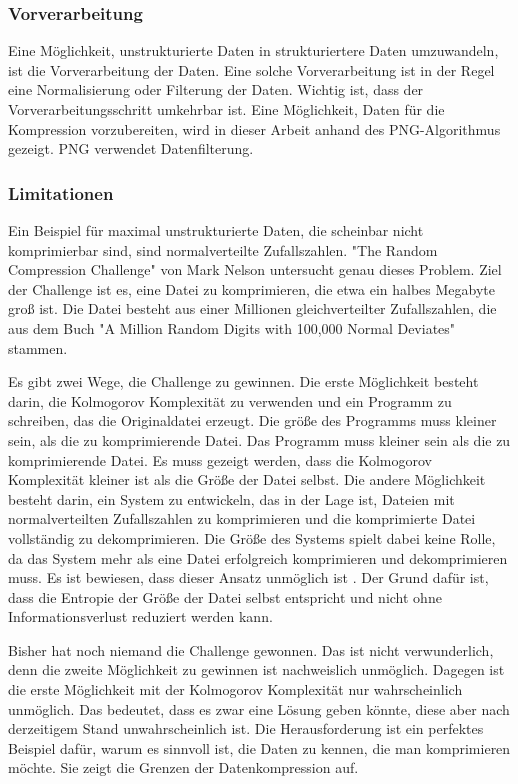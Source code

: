 \documentclass[conference]{IEEEtran}
\begin{document}
\subsubsection{Vorverarbeitung}

Eine Möglichkeit, unstrukturierte Daten in strukturiertere Daten umzuwandeln, ist 
die Vorverarbeitung der Daten. 
Eine solche Vorverarbeitung ist in der Regel eine Normalisierung oder Filterung 
der Daten. 
Wichtig ist, dass der Vorverarbeitungsschritt umkehrbar ist. 
Eine Möglichkeit, Daten für die Kompression vorzubereiten, wird in dieser Arbeit 
anhand des PNG-Algorithmus gezeigt. 
PNG verwendet Datenfilterung.

\subsubsection{Limitationen}

Ein Beispiel für maximal unstrukturierte Daten, die scheinbar nicht komprimierbar 
sind, sind normalverteilte Zufallszahlen. 
"The Random Compression Challenge" von Mark Nelson \cite{nelson} untersucht 
genau dieses Problem. 
Ziel der Challenge ist es, eine Datei zu komprimieren, die etwa ein halbes Megabyte groß ist.
Die Datei besteht aus einer Millionen gleichverteilter Zufallszahlen, die aus dem 
Buch "A Million Random Digits with 100,000 Normal Deviates" \cite{amilli} stammen.

Es gibt zwei Wege, die Challenge zu gewinnen.
Die erste Möglichkeit besteht darin, die Kolmogorov Komplexität zu verwenden und 
ein Programm zu schreiben, das die Originaldatei erzeugt.
Die größe des Programms muss kleiner sein, als die zu komprimierende Datei.
Das Programm muss kleiner sein als die zu komprimierende Datei. Es muss gezeigt werden, 
dass die Kolmogorov Komplexität kleiner ist als die Größe der Datei selbst.
Die andere Möglichkeit besteht darin, ein System zu entwickeln, das in der Lage 
ist, Dateien mit normalverteilten Zufallszahlen zu komprimieren und die komprimierte 
Datei vollständig zu dekomprimieren. 
Die Größe des Systems spielt dabei keine Rolle, da das System mehr als eine Datei 
erfolgreich komprimieren und dekomprimieren muss. 
Es ist bewiesen, dass dieser Ansatz unmöglich ist \cite{nelson}. 
Der Grund dafür ist, dass die Entropie der Größe der Datei selbst entspricht und 
nicht ohne Informationsverlust reduziert werden kann.

Bisher hat noch niemand die Challenge gewonnen. 
Das ist nicht verwunderlich, denn die zweite Möglichkeit zu gewinnen ist 
nachweislich unmöglich. 
Dagegen ist die erste Möglichkeit mit der Kolmogorov Komplexität nur wahrscheinlich 
unmöglich. 
Das bedeutet, dass es zwar eine Lösung geben könnte, diese aber nach derzeitigem 
Stand unwahrscheinlich ist. 
Die Herausforderung ist ein perfektes Beispiel dafür, warum es sinnvoll ist, die 
Daten zu kennen, die man komprimieren möchte. 
Sie zeigt die Grenzen der Datenkompression auf.
\end{document}
